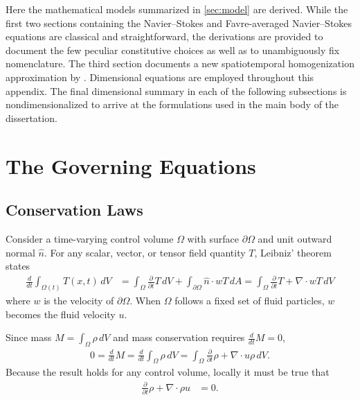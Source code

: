 \label{sec:derivation}

Here the mathematical models summarized in \autoref{sec:model} are derived.
While the first two sections containing the Navier--Stokes and Favre-averaged
Navier--Stokes equations are classical and straightforward, the derivations are
provided to document the few peculiar constitutive choices as well as to
unambiguously fix nomenclature.  The third section documents a new
spatiotemporal homogenization approximation by \citet{Topalian2014Spatiotemporal}.
%
Dimensional equations are employed throughout this appendix.  The final
dimensional summary in each of the following subsections is nondimensionalized
to arrive at the formulations used in the main body of the dissertation.

\section{The Governing Equations}

\subsection{Conservation Laws}

Consider a time-varying control volume $\Omega$ with surface
$\partial\!\Omega$ and unit outward normal $\hat{n}$.  For any
scalar, vector, or tensor field quantity
$T$, Leibniz' theorem states
\begin{align}
  \label{eq:rtt}
  \frac{d}{dt}\int_{\Omega(t)}T(x,t)\,dV
  &=
  \int_{\Omega}\frac{\partial\!}{\partial\!t}T\,dV
  +
  \int_{\partial\!\Omega} \hat{n}\cdot{}w T\,dA
  =
  \int_{\Omega}\frac{\partial\!}{\partial\!t}T+\nabla\cdot{}wT\,dV
\end{align}
where $w$ is the velocity of $\partial\!\Omega$.  When $\Omega$ follows
a fixed set of fluid particles, $w$ becomes the fluid velocity $u$.

Since mass $M=\int_{\Omega} \rho\,dV$
and mass conservation requires $\frac{d}{dt}M=0$,
\begin{align}
  0 = \frac{d}{dt}M
  = \frac{d}{dt}\int_{\Omega} \rho\,dV
  =
  \int_{\Omega}\frac{\partial\!}{\partial\!t}\rho+\nabla\cdot{}u\rho{}\,dV.
\end{align}
Because the result holds for any control volume, locally it must be true
that
\begin{align}
  \label{eq:cons_mass}
  \frac{\partial\!}{\partial\!t}\rho+\nabla\cdot\rho{}u &= 0.
\end{align}

